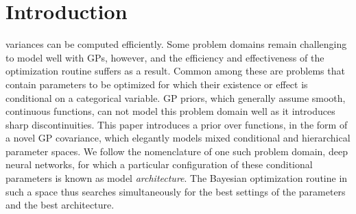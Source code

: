 \documentclass{article}
\begin{document}
\section{Introduction}

variances can be computed efficiently.  Some problem domains remain challenging to model well with GPs, however, and the efficiency and effectiveness of the optimization routine suffers as a result.  Common among these are problems that contain parameters to be optimized for which their existence or effect is conditional on a categorical variable.  GP priors, which generally assume smooth, continuous functions, can not model this problem domain well as it introduces sharp discontinuities.  This paper introduces a prior over functions, in the form of a novel GP covariance, which elegantly models mixed conditional and hierarchical parameter spaces.  We follow the nomenclature of one such problem domain, deep neural networks, for which a particular configuration of these conditional parameters is known as model \emph{architecture}.  The Bayesian optimization routine in such a space thus searches simultaneously for the best settings of the parameters and the best architecture.
\end{document}
